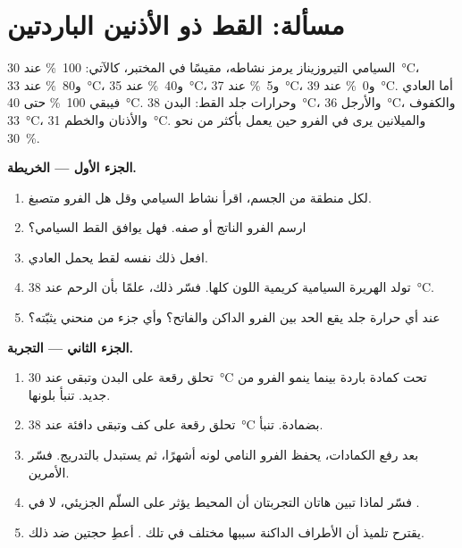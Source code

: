 \section{مسألة: القط ذو الأذنين الباردتين}

\begin{problem}
\label{pb:g11:enzymes-and-phenotype:1}
 السيامي  التيروزيناز يرمز  نشاطه، مقيسًا في
المختبر، كالآتي: \qty{100}{\percent} عند \qty{30}{\celsius}،
و\qty{80}{\percent} عند \qty{33}{\celsius}، و\qty{40}{\percent} عند
\qty{35}{\celsius}، و\qty{5}{\percent} عند \qty{37}{\celsius}،
و\qty{0}{\percent} عند \qty{39}{\celsius}. أما   العادي
فيبقي \qty{100}{\percent} حتى \qty{40}{\celsius}. وحرارات جلد القط:
البدن \qty{38}{\celsius}، والأرجل \qty{36}{\celsius}، والكفوف
\qty{33}{\celsius}، والأذنان والخطم \qty{31}{\celsius}. والميلانين
يرى في الفرو حين يعمل  بأكثر من نحو \qty{30}{\percent}.

\medskip
\noindent\textbf{الجزء الأول --- الخريطة.}
\begin{enumerate}
  \item لكل منطقة من الجسم، اقرأ نشاط  السيامي وقل هل الفرو
        متصبغ.
  \item ارسم الفرو الناتج أو صفه. فهل يوافق القط السيامي؟
  \item افعل ذلك نفسه لقط يحمل  العادي.
  \item تولد الهريرة السيامية كريمية اللون كلها. فسّر ذلك، علمًا بأن
        الرحم عند \qty{38}{\celsius}.
  \item عند أي حرارة جلد يقع الحد بين الفرو الداكن والفاتح؟ وأي جزء
        من منحني  يثبّته؟
\end{enumerate}

\medskip
\noindent\textbf{الجزء الثاني --- التجربة.}
\begin{enumerate}[resume]
  \item تحلق رقعة على البدن وتبقى عند \qty{30}{\celsius} تحت كمادة
        باردة بينما ينمو الفرو من جديد. تنبأ بلونها.
  \item تحلق رقعة على كف وتبقى دافئة عند \qty{38}{\celsius} بضمادة.
        تنبأ.
  \item بعد رفع الكمادات، يحفظ الفرو النامي لونه أشهرًا، ثم يستبدل
        بالتدريج. فسّر الأمرين.
  \item فسّر لماذا تبين هاتان التجربتان أن المحيط يؤثر على السلّم
        الجزيئي، لا في .
  \item يقترح تلميذ أن الأطراف الداكنة سببها  مختلف في تلك
        . أعطِ حجتين ضد ذلك.
\end{enumerate}


\end{problem}
